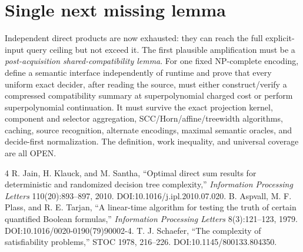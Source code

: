 \documentclass[11pt]{article}
\begin{document}
\section{Single next missing lemma}
Independent direct products are now exhausted: they can reach the full
explicit-input query ceiling but not exceed it.  The first plausible
amplification must be a \emph{post-acquisition shared-compatibility lemma}.
For one fixed NP-complete encoding, define a semantic interface independently
of runtime and prove that every uniform exact decider, after reading the source,
must either construct/verify a compressed compatibility summary at
superpolynomial charged cost or perform superpolynomial continuation.  It must
survive the exact projection kernel, component and selector aggregation,
SCC/Horn/affine/treewidth algorithms, caching, source recognition, alternate
encodings, maximal semantic oracles, and decide-first normalization.  The
definition, work inequality, and universal coverage are all OPEN.

\begin{thebibliography}{4}
R. Jain, H. Klauck, and M. Santha,
``Optimal direct sum results for deterministic and randomized decision tree
complexity,'' \emph{Information Processing Letters} 110(20):893--897, 2010.
DOI:10.1016/j.ipl.2010.07.020.
B. Aspvall, M. F. Plass, and R. E. Tarjan,
``A linear-time algorithm for testing the truth of certain quantified Boolean
formulas,'' \emph{Information Processing Letters} 8(3):121--123, 1979.
DOI:10.1016/0020-0190(79)90002-4.
T. J. Schaefer, ``The complexity of satisfiability problems,''
STOC 1978, 216--226. DOI:10.1145/800133.804350.
\end{thebibliography}
\end{document}

